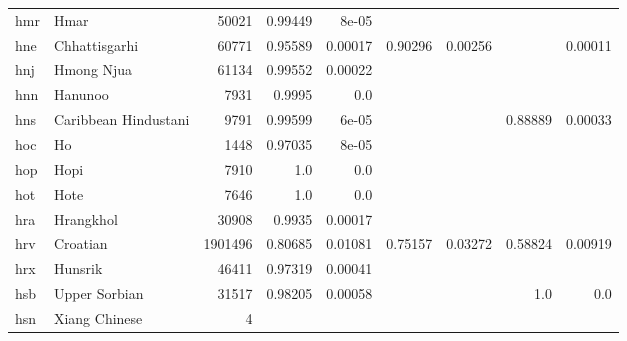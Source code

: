 \documentclass[11pt]{article}
\begin{document}
\begin{table*}[h]
{\begin{tabular}{llrrrrrrr}
hmr         & Hmar         & 50021         & 0.99449         & 8e-05         &          &          &          &          \\

hne         & Chhattisgarhi         & 60771         & 0.95589         & 0.00017         & 0.90296         & 0.00256         &          & 0.00011         \\

hnj         & Hmong Njua         & 61134         & 0.99552         & 0.00022         &          &          &          &          \\

hnn         & Hanunoo         & 7931         & 0.9995         & 0.0         &          &          &          &          \\

hns         & Caribbean Hindustani         & 9791         & 0.99599         & 6e-05         &          &          & 0.88889         & 0.00033         \\

hoc         & Ho         & 1448         & 0.97035         & 8e-05         &          &          &          &          \\

hop         & Hopi         & 7910         & 1.0         & 0.0         &          &          &          &          \\

hot         & Hote         & 7646         & 1.0         & 0.0         &          &          &          &          \\

hra         & Hrangkhol         & 30908         & 0.9935         & 0.00017         &          &          &          &          \\

hrv         & Croatian         & 1901496         & 0.80685         & 0.01081         & 0.75157         & 0.03272         & 0.58824         & 0.00919         \\

hrx         & Hunsrik         & 46411         & 0.97319         & 0.00041         &          &          &          &          \\

hsb         & Upper Sorbian         & 31517         & 0.98205         & 0.00058         &          &          & 1.0         & 0.0         \\

hsn         & Xiang Chinese         & 4         &          &          &          &          &          &          \\


\end{tabular}}
\end{table*}
\end{document}
